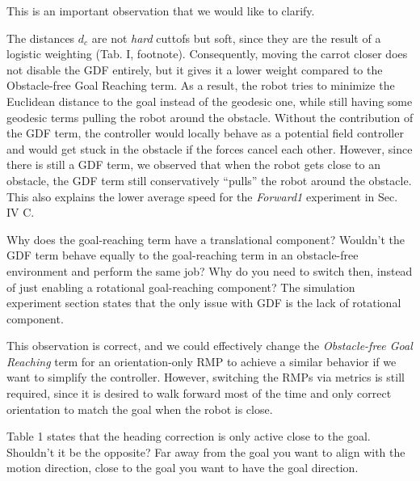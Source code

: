 \documentclass[a4paper,11pt]{article}
\begin{document}
This is an important observation that we would like to clarify.
\begin{outline}[enumerate]
	\1 The distances $d_c$ are not \emph{hard} cuttofs but soft, since they are 
	the result of a logistic weighting (Tab. I, footnote).
	\1 Consequently, moving the carrot closer does not disable the GDF 
	entirely, but it gives it a lower weight compared to the Obstacle-free Goal 
	Reaching term.
	\1 As a result, the robot tries to minimize the Euclidean distance to the 
	goal instead of the geodesic one, while still having some geodesic terms 
	pulling the robot around the obstacle.
	\1 Without the contribution of the GDF term, the controller would locally 
	behave as a potential field controller and would get stuck in the obstacle 
	if the forces cancel each other.
	\1 However, since there is still a GDF term, we observed that when the robot 
	gets close to an obstacle, the GDF term still conservatively ``pulls'' 
	the robot around the obstacle. This also explains the lower average speed 
	for the \emph{Forward1} experiment in Sec. IV C.
\end{outline}

\begin{displayquote}
	Why does the goal-reaching term have a translational component?
	Wouldn’t the GDF term behave equally to the goal-reaching term in an
	obstacle-free environment and perform the same job? Why do you need to
	switch then, instead of just enabling a rotational goal-reaching
	component? The simulation experiment section states that the only issue
	with GDF is the lack of rotational component.
\end{displayquote}

\begin{outline}[enumerate]
	\1 This observation is correct, and we could effectively change the 
	\emph{Obstacle-free Goal Reaching} term for an orientation-only RMP to 
	achieve a similar behavior if we want to simplify the controller.
	\1 However, switching the RMPs via metrics is still required, since it is 
	desired to walk forward most of the time and only correct orientation to 
	match the goal when the robot is close.
\end{outline}

\begin{displayquote}
	Table 1 states that the heading correction is only active close to the
	goal. Shouldn’t it be the opposite? Far away from the goal you want to
	align with the motion direction, close to the goal you want to have the
	goal direction.
\end{displayquote}
\end{document}

